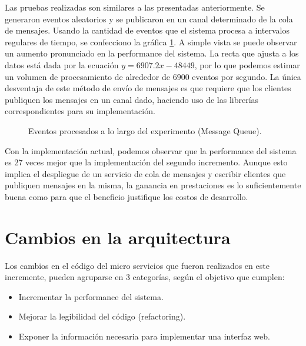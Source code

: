 \documentclass[a4paper,10pt, oneside]{article}
\begin{document}
Las pruebas realizadas son similares a las presentadas anteriormente. Se generaron eventos aleatorios y se publicaron en un canal determinado de la cola de mensajes. Usando la cantidad de eventos que el sistema procesa a intervalos regulares de tiempo, se confecciono la gráfica \ref{fig:MQ}. A simple vista se puede observar un aumento pronunciado en la performance del sistema. La recta que ajusta a los datos está dada por la ecuación $y = 6907.2 x - 48449$, por lo que podemos estimar un volumen de procesamiento de alrededor de $6900$ eventos por segundo. La única desventaja de este método de envío de mensajes es que requiere que los clientes publiquen los mensajes en un canal dado, haciendo uso de las librerías correspondientes para su implementación.
\begin{figure}[htpb]
	\centering
	
	\caption{Eventos procesados a lo largo del experimento (Message Queue).} \label{fig:MQ}
\end{figure}

Con la implementación actual, podemos observar que la performance del sistema es 27 veces mejor que la implementación del segundo incremento. Aunque esto implica el despliegue de un servicio de cola de mensajes y escribir clientes que publiquen mensajes en la misma, la ganancia en prestaciones es lo suficientemente buena como para que el beneficio justifique los costos de desarrollo.

\section{Cambios en la arquitectura}
Los cambios en el código del micro servicios que fueron realizados en este incremente, pueden agruparse en 3 categorías, según el objetivo que cumplen:
\begin{itemize}
	\item Incrementar la performance del sistema.
	\item Mejorar la legibilidad del código (refactoring).
	\item Exponer la información necesaria para implementar una interfaz web.
\end{itemize}
\end{document}
